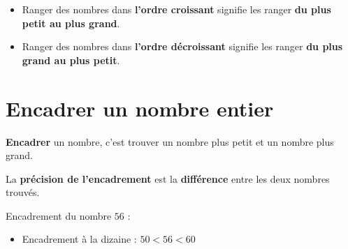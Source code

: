\begin{pageCours}

\begin{Def}
\begin{itemize}
\item Ranger des nombres dans \textbf{l'ordre croissant} signifie les ranger \textbf{du plus petit au plus grand}.
\item Ranger des nombres dans \textbf{l'ordre décroissant} signifie les ranger \textbf{du plus grand au plus petit}.
\end{itemize}
\end{Def}




\section{Encadrer un nombre entier}

\begin{Def}
\textbf{Encadrer} un nombre, c'est trouver un nombre plus petit et un nombre plus grand.

La \textbf{précision de l'encadrement} est la \textbf{différence} entre les deux nombres trouvés.
\end{Def}

\begin{Ex}
Encadrement du nombre $56$ :
 \begin{itemize}
\item Encadrement à la dizaine : \(50 < 56< 60\)


\end{itemize}
\end{Ex}
\end{pageCours}
